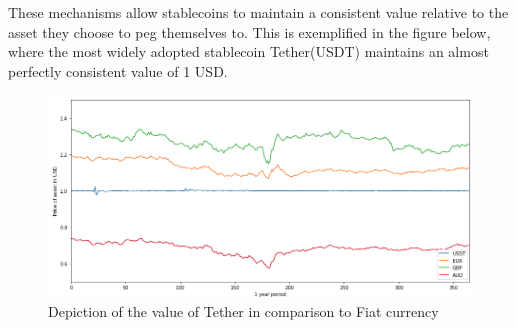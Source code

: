 \documentclass[bsc,frontabs,singlespacing,parskip,deptreport]{infthesis}
\begin{document}
    These mechanisms allow stablecoins to maintain a consistent value relative to the asset they choose to peg themselves to. This is exemplified in the figure below, where the most widely adopted stablecoin Tether(USDT) maintains an almost perfectly consistent value of 1 USD.   
    \begin{figure}[h]
            \centering
         \includegraphics[width=\linewidth]{Images and Figures/tether.png}
              \caption{Depiction of the value of Tether in comparison to Fiat currency}
              \label{fig:boat1}
    \end{figure}
\end{document}
